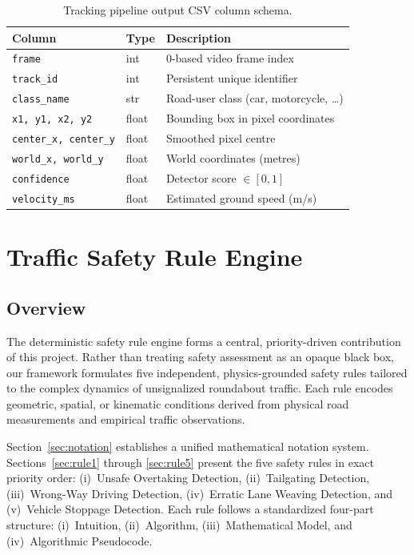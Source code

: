 \documentclass[12pt,a4paper]{report}
\begin{document}
\begin{table}[H]
\centering
\caption{Tracking pipeline output CSV column schema.}
\label{tab:csv_schema}
\begin{tabular}{lll}
\toprule
\textbf{Column} & \textbf{Type} & \textbf{Description} \\
\midrule
\texttt{frame}              & int   & 0-based video frame index \\
\texttt{track\_id}          & int   & Persistent unique identifier \\
\texttt{class\_name}        & str   & Road-user class (car, motorcycle, \ldots) \\
\texttt{x1, y1, x2, y2}    & float & Bounding box in pixel coordinates \\
\texttt{center\_x, center\_y} & float & Smoothed pixel centre \\
\texttt{world\_x, world\_y}   & float & World coordinates (metres) \\
\texttt{confidence}         & float & Detector score $\in [0,1]$ \\
\texttt{velocity\_ms}       & float & Estimated ground speed (m/s) \\
\bottomrule
\end{tabular}
\end{table}
\clearpage\thispagestyle{empty}\newpage

\chapter{Traffic Safety Rule Engine}
\label{chap:safety}

\section{Overview}

The deterministic safety rule engine forms a central, priority-driven contribution of this project. Rather than treating safety assessment as an opaque black box, our framework formulates five independent, physics-grounded safety rules tailored to the complex dynamics of unsignalized roundabout traffic. Each rule encodes geometric, spatial, or kinematic conditions derived from physical road measurements and empirical traffic observations.

Section~\ref{sec:notation} establishes a unified mathematical notation system. Sections~\ref{sec:rule1} through \ref{sec:rule5} present the five safety rules in exact priority order: (i)~Unsafe Overtaking Detection, (ii)~Tailgating Detection, (iii)~Wrong-Way Driving Detection, (iv)~Erratic Lane Weaving Detection, and (v)~Vehicle Stoppage Detection. Each rule follows a standardized four-part structure: (i)~Intuition, (ii)~Algorithm, (iii)~Mathematical Model, and (iv)~Algorithmic Pseudocode.
\end{document}
